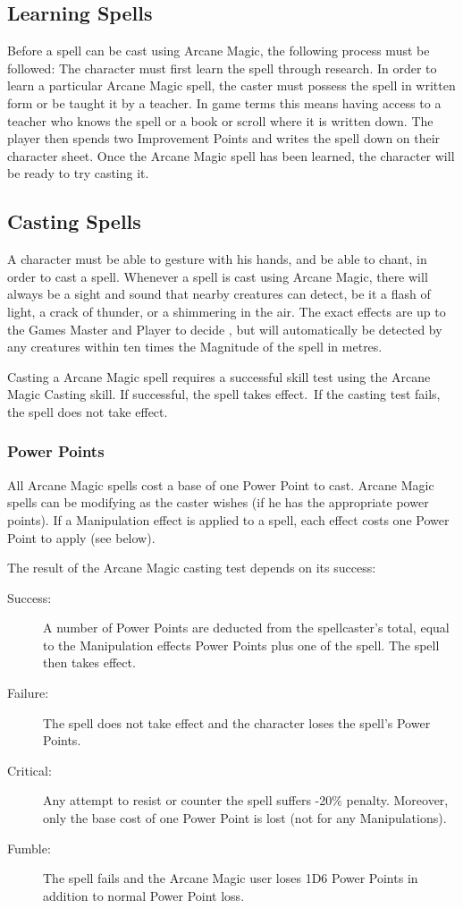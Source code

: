\subsection{Learning Spells}
Before a spell can be cast using Arcane Magic, the following process must be followed:
The character must first learn the spell through research. In order to learn a particular Arcane Magic spell, the caster must possess the spell in written form or be taught it by a teacher. In game terms this means having access to a teacher who knows the spell or a book or scroll where it is written down. The player then spends two Improvement Points and writes the spell down on their character sheet. Once the Arcane Magic spell has been learned, the character will be ready to try casting it.



\subsection{Casting Spells}
A character must be able to gesture with his hands, and be able to chant, in order to cast a spell. Whenever a spell is cast using Arcane Magic, there will always be a sight and sound that nearby creatures can detect, be it a flash of light, a crack of thunder, or a shimmering in the air. The exact effects are up to the Games Master and Player to decide , but will automatically be detected by any creatures within ten times the Magnitude of the spell in metres. 

Casting a Arcane Magic spell requires a successful skill test using the Arcane Magic Casting skill. If successful, the spell takes effect. If the casting test fails, the spell does not take effect. 

\subsubsection{Power Points}
All Arcane Magic spells cost a base of one Power Point to cast. Arcane Magic spells can be modifying as the caster wishes (if he has the appropriate power points). If a Manipulation effect is applied to a spell, each effect costs one Power Point to apply (see below). 

The result of the Arcane Magic casting test depends on its success:
\begin{description}
	\item[Success:] A number of Power Points are deducted from the spellcaster’s total, equal to the Manipulation effects Power Points plus one of the spell. The spell then takes effect.
	\item[Failure:] The spell does not take effect and the character loses the spell's Power Points.
	\item[Critical:] Any attempt to resist or counter the spell suffers -20\% penalty. Moreover, only the base cost of one Power Point is lost (not for any Manipulations).
	\item[Fumble:] The spell fails and the Arcane Magic user loses 1D6 Power Points in addition to normal Power Point loss.
\end{description}


